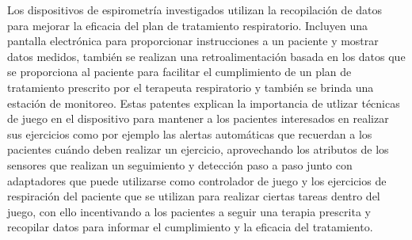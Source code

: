 Los dispositivos de espirometr\'ia investigados utilizan la recopilaci\'on de datos para mejorar la eficacia del plan de tratamiento respiratorio. Incluyen una pantalla electr\'onica para proporcionar instrucciones a un paciente y mostrar datos medidos, tambi\'en se realizan una retroalimentaci\'on basada en los datos que se proporciona al paciente para facilitar el cumplimiento de un plan de tratamiento prescrito por el terapeuta respiratorio y tambi\'en se  brinda una estaci\'on de monitoreo. Estas patentes explican la importancia de utlizar  t\'ecnicas de juego en el dispositivo para mantener a los pacientes interesados en realizar sus ejercicios como por ejemplo las alertas autom\'aticas  que recuerdan a los pacientes cu\'ando deben realizar un ejercicio, aprovechando los atributos de los sensores que realizan un seguimiento y detecci\'on paso a paso junto con adaptadores que puede utilizarse como controlador de juego y los ejercicios de respiraci\'on del paciente que se utilizan para realizar ciertas tareas dentro del juego, con ello incentivando a los pacientes a seguir una terapia prescrita y recopilar datos para informar el cumplimiento y la eficacia del tratamiento. \cite{26}

